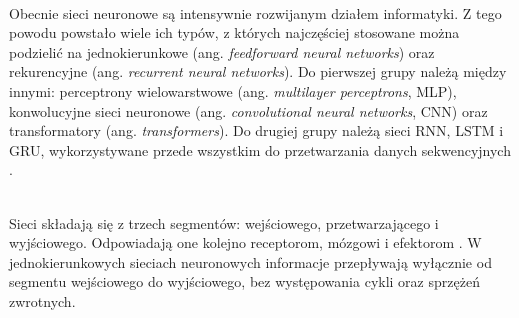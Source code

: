 \noindent\\
Obecnie sieci neuronowe są intensywnie
rozwijanym działem informatyki.
Z tego powodu powstało wiele ich typów,
z których najczęściej stosowane
można podzielić na jednokierunkowe
(ang. \textit{feedforward neural networks})
oraz rekurencyjne
(ang. \textit{recurrent neural networks}).
Do pierwszej grupy należą między innymi:
perceptrony wielowarstwowe
(ang. \textit{multilayer perceptrons}, MLP),
konwolucyjne sieci neuronowe
(ang. \textit{convolutional neural networks}, CNN)
oraz transformatory (ang. \textit{transformers}).
Do drugiej grupy należą sieci RNN, LSTM i GRU,
wykorzystywane przede wszystkim
do przetwarzania danych sekwencyjnych%
%
.

\noindent\\
Sieci składają się z trzech segmentów:
wejściowego, przetwarzającego i wyjściowego.
Odpowiadają one kolejno receptorom, mózgowi i efektorom%
.
W jednokierunkowych sieciach neuronowych
informacje przepływają wyłącznie
od segmentu wejściowego do wyjściowego,
bez występowania cykli oraz sprzężeń zwrotnych.

